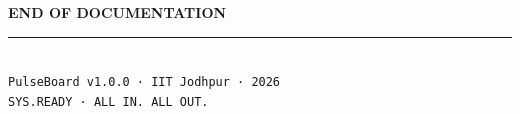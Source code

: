 \documentclass[12pt,a4paper]{report}
\begin{document}
\newpage
\begin{center}
\vspace*{8cm}
{\Huge\bfseries\color{darkbg} END OF DOCUMENTATION}\\[1cm]
\textcolor{accent}{\rule{8cm}{2pt}}\\[0.6cm]
{\large\color{gray}\texttt{PulseBoard v1.0.0 · IIT Jodhpur · 2026}}\\[0.3cm]
{\small\color{gray}\texttt{SYS.READY · ALL IN. ALL OUT.}}
\end{center}
\end{document}
